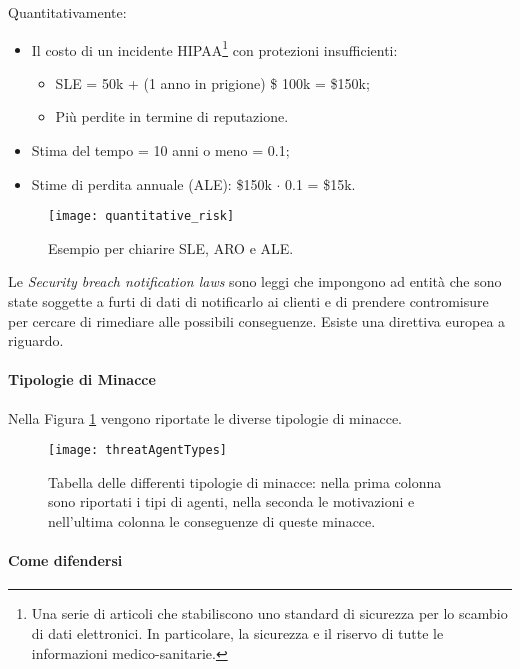 
Quantitativamente:
\begin{itemize}
\item Il costo di un incidente HIPAA\footnote{Una serie di articoli
che stabiliscono uno standard di sicurezza
per lo scambio di dati elettronici. In particolare, la sicurezza e il 
riservo di tutte le informazioni medico-sanitarie.} 
con protezioni insufficienti:
\begin{itemize}
 \item SLE = 50k + (1 anno in prigione) \$ 100k = \$150k;
 \item Più perdite in termine di reputazione.
\end{itemize}
\item Stima del tempo = 10 anni o meno = 0.1;
\item Stime di perdita annuale (ALE): \$150k $\cdot$ 0.1 = \$15k.
\end{itemize}


\begin{figure}[H]
 \centering
 \texttt{[image: quantitative\_risk]}
 \caption{Esempio per chiarire SLE, ARO e ALE.}
\end{figure}

Le \textit{Security breach notification laws} sono leggi che impongono ad
entità che sono state soggette a furti di dati di notificarlo ai clienti e di
prendere contromisure per cercare di rimediare alle possibili conseguenze.
Esiste una direttiva europea a riguardo.


\paragraph*{Tipologie di Minacce}
Nella Figura \ref{fig:threat:types} vengono riportate le diverse 
tipologie di minacce.
\begin{figure}[H]
 \centering
 \texttt{[image: threatAgentTypes]}
 \caption[Tabella delle differenti tipologie di minacce]{Tabella delle 
 differenti tipologie di minacce: nella prima colonna sono riportati
 i tipi di agenti, nella seconda le motivazioni e nell'ultima colonna
 le conseguenze di queste minacce.}
 \label{fig:threat:types}
\end{figure}


\paragraph*{Come difendersi}


